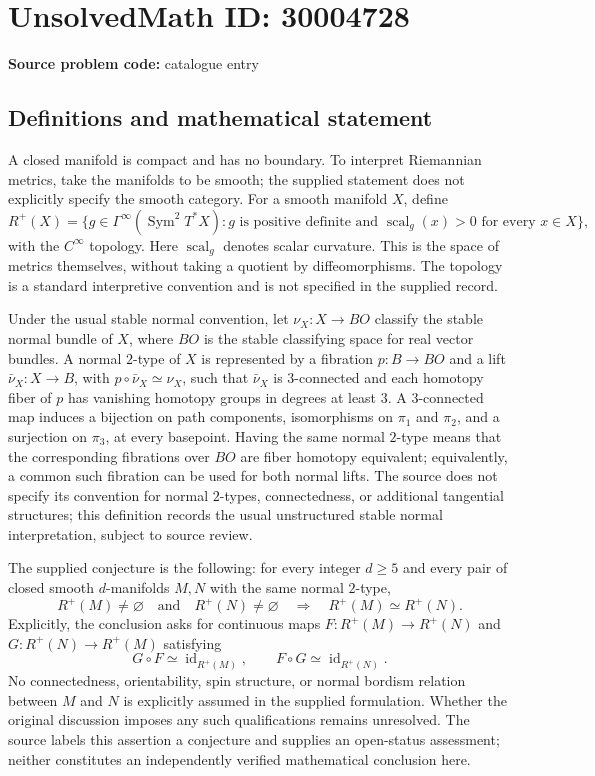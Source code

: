 \documentclass[11pt]{article}
\begin{document}
\section*{UnsolvedMath ID: 30004728}
\textbf{Source problem code:} catalogue entry
\subsection{Definitions and mathematical statement}
A closed manifold is compact and has no boundary. To interpret Riemannian metrics, take the manifolds to be smooth; the supplied statement does not explicitly specify the smooth category. For a smooth manifold \(X\), define
\[
R^+(X)=\{g\in\Gamma^\infty(\operatorname{Sym}^2T^*X): g\text{ is positive definite and }\operatorname{scal}_g(x)>0\text{ for every }x\in X\},
\]
with the \(C^\infty\) topology. Here \(\operatorname{scal}_g\) denotes scalar curvature. This is the space of metrics themselves, without taking a quotient by diffeomorphisms. The topology is a standard interpretive convention and is not specified in the supplied record.

Under the usual stable normal convention, let \(\nu_X:X\to BO\) classify the stable normal bundle of \(X\), where \(BO\) is the stable classifying space for real vector bundles. A normal \(2\)-type of \(X\) is represented by a fibration \(p:B\to BO\) and a lift \(\bar\nu_X:X\to B\), with \(p\circ\bar\nu_X\simeq\nu_X\), such that \(\bar\nu_X\) is \(3\)-connected and each homotopy fiber of \(p\) has vanishing homotopy groups in degrees at least \(3\). A \(3\)-connected map induces a bijection on path components, isomorphisms on \(\pi_1\) and \(\pi_2\), and a surjection on \(\pi_3\), at every basepoint. Having the same normal \(2\)-type means that the corresponding fibrations over \(BO\) are fiber homotopy equivalent; equivalently, a common such fibration can be used for both normal lifts. The source does not specify its convention for normal \(2\)-types, connectedness, or additional tangential structures; this definition records the usual unstructured stable normal interpretation, subject to source review.

The supplied conjecture is the following: for every integer \(d\geq5\) and every pair of closed smooth \(d\)-manifolds \(M,N\) with the same normal \(2\)-type,
\[
R^+(M)\neq\varnothing\quad\text{and}\quad R^+(N)\neq\varnothing
\quad\Longrightarrow\quad
R^+(M)\simeq R^+(N).
\]
Explicitly, the conclusion asks for continuous maps \(F:R^+(M)\to R^+(N)\) and \(G:R^+(N)\to R^+(M)\) satisfying
\[
G\circ F\simeq\operatorname{id}_{R^+(M)},\qquad
F\circ G\simeq\operatorname{id}_{R^+(N)}.
\]
No connectedness, orientability, spin structure, or normal bordism relation between \(M\) and \(N\) is explicitly assumed in the supplied formulation. Whether the original discussion imposes any such qualifications remains unresolved. The source labels this assertion a conjecture and supplies an open-status assessment; neither constitutes an independently verified mathematical conclusion here.
\end{document}
